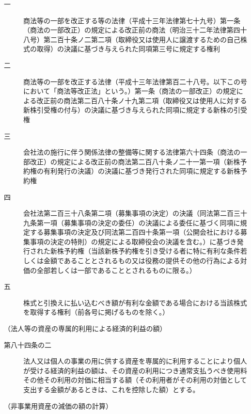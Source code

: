\documentclass[twocolumn,a4j,10pt]{ltjtarticle}
\begin{document}
\begin{description}
\begin{description}
\item[一]商法等の一部を改正する等の法律（平成十三年法律第七十九号）第一条（商法の一部改正）の規定による改正前の商法（明治三十二年法律第四十八号）第二百十条ノ二第二項（取締役又は使用人に譲渡するための自己株式の取得）の決議に基づき与えられた同項第三号に規定する権利
\item[二]商法等の一部を改正する法律（平成十三年法律第百二十八号。以下この号において「商法等改正法」という。）第一条（商法の一部改正）の規定による改正前の商法第二百八十条ノ十九第二項（取締役又は使用人に対する新株引受権の付与）の決議に基づき与えられた同項に規定する新株の引受権
\item[三]会社法の施行に伴う関係法律の整備等に関する法律第六十四条（商法の一部改正）の規定による改正前の商法第二百八十条ノ二十一第一項（新株予約権の有利発行の決議）の決議に基づき発行された同項に規定する新株予約権
\item[四]会社法第二百三十八条第二項（募集事項の決定）の決議（同法第二百三十九条第一項（募集事項の決定の委任）の決議による委任に基づく同項に規定する募集事項の決定及び同法第二百四十条第一項（公開会社における募集事項の決定の特則）の規定による取締役会の決議を含む。）に基づき発行された新株予約権（当該新株予約権を引き受ける者に特に有利な条件若しくは金額であることとされるもの又は役務の提供その他の行為による対価の全部若しくは一部であることとされるものに限る。）
\item[五]株式と引換えに払い込むべき額が有利な金額である場合における当該株式を取得する権利（前各号に掲げるものを除く。）
\end{description}
\end{description}
\noindent\hspace{10pt}（法人等の資産の専属的利用による経済的利益の額）
\begin{description}
\item[第八十四条の二]法人又は個人の事業の用に供する資産を専属的に利用することにより個人が受ける経済的利益の額は、その資産の利用につき通常支払うべき使用料その他その利用の対価に相当する額（その利用者がその利用の対価として支出する金額があるときは、これを控除した額）とする。
\end{description}
\noindent\hspace{10pt}（非事業用資産の減価の額の計算）
\end{document}
